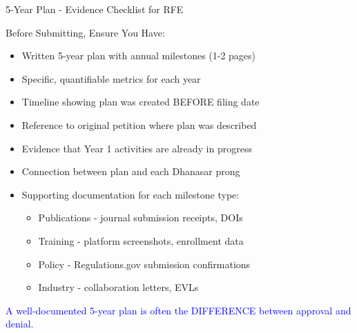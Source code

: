 \documentclass[11pt]{beamer}
\begin{document}
	\begin{frame}{5-Year Plan - Evidence Checklist for RFE}
		\scriptsize
		\begin{block}{Before Submitting, Ensure You Have:}
			\begin{itemize}
				\item [$\square$] Written 5-year plan with annual milestones (1-2 pages)
				\item [$\square$] Specific, quantifiable metrics for each year
				\item [$\square$] Timeline showing plan was created BEFORE filing date
				\item [$\square$] Reference to original petition where plan was described
				\item [$\square$] Evidence that Year 1 activities are already in progress
				\item [$\square$] Connection between plan and each Dhanasar prong
				\item [$\square$] Supporting documentation for each milestone type:
				\begin{itemize}
					\item Publications - journal submission receipts, DOIs
					\item Training - platform screenshots, enrollment data
					\item Policy - Regulations.gov submission confirmations
					\item Industry - collaboration letters, EVLs
				\end{itemize}
			\end{itemize}
			\textcolor{blue}{A well-documented 5-year plan is often the DIFFERENCE between approval and denial.}
		\end{block}
	\end{frame}
	
	
	
	
\end{document}
